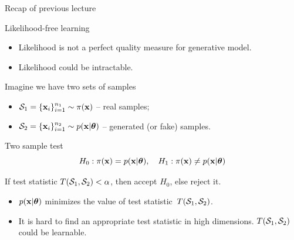 

\begin{frame}
\titlepage
\end{frame}
\begin{frame}{Recap of previous lecture}
	\begin{block}{Likelihood-free learning}
		\begin{itemize}
			\item Likelihood is not a perfect quality measure for generative model.
			\item Likelihood could be intractable.
		\end{itemize}
	\end{block}
	Imagine we have two sets of samples 
	\begin{itemize}
		\item $\mathcal{S}_1 = \{\mathbf{x}_i\}_{i=1}^{n_1} \sim \pi(\mathbf{x})$ -- real samples;
		\item $\mathcal{S}_2 = \{\mathbf{x}_i\}_{i=1}^{n_2} \sim p(\mathbf{x} | \boldsymbol{\theta})$ -- generated (or fake) samples.
	\end{itemize}
	\begin{block}{Two sample test}
		\vspace{-0.3cm}
		\[
			H_0: \pi(\mathbf{x}) = p(\mathbf{x} | \boldsymbol{\theta}), \quad H_1: \pi(\mathbf{x}) \neq p(\mathbf{x} | \boldsymbol{\theta})
		\]
	\end{block}
	If test statistic $T(\mathcal{S}_1, \mathcal{S}_2) < \alpha$, then accept $H_0$, else reject it.
		\begin{itemize}
			\item $p(\mathbf{x} | \boldsymbol{\theta})$ minimizes the value of test statistic~$T(\mathcal{S}_1, \mathcal{S}_2)$.
			\item It is hard to find an appropriate test statistic in high dimensions. $T(\mathcal{S}_1, \mathcal{S}_2)$ could be learnable.
		\end{itemize}
\end{frame}
